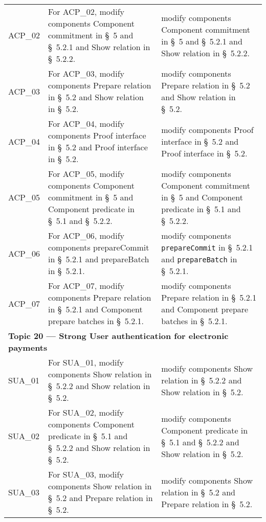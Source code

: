 \begin{landscape}
\begin{longtable}{p{3cm} p{10cm} p{7cm}}
ACP\_02 &
For ACP\_02, modify components Component commitment in \S~5 and \S~5.2.1 and Show relation in \S~5.2.2. &
modify components Component commitment in \S~5 and \S~5.2.1 and Show relation in \S~5.2.2. \\

ACP\_03 &
For ACP\_03, modify components Prepare relation in \S~5.2 and Show relation in \S~5.2. &
modify components Prepare relation in \S~5.2 and Show relation in \S~5.2. \\

ACP\_04 &
For ACP\_04, modify components Proof interface in \S~5.2 and Proof interface in \S~5.2. &
modify components Proof interface in \S~5.2 and Proof interface in \S~5.2. \\

ACP\_05 &
For ACP\_05, modify components Component commitment in \S~5 and Component predicate in \S~5.1 and \S~5.2.2. &
modify components Component commitment in \S~5 and Component predicate in \S~5.1 and \S~5.2.2. \\

ACP\_06 &
For ACP\_06, modify components prepareCommit in \S~5.2.1 and prepareBatch in \S~5.2.1. &
modify components \texttt{prepareCommit} in \S~5.2.1 and \texttt{prepareBatch} in \S~5.2.1. \\

ACP\_07 &
For ACP\_07, modify components Prepare relation in \S~5.2.1 and Component prepare batches in \S~5.2.1. &
modify components Prepare relation in \S~5.2.1 and Component prepare batches in \S~5.2.1. \\[1em]


\multicolumn{3}{l}{\textbf{Topic 20 — Strong User authentication for electronic payments}}\\

SUA\_01 &
For SUA\_01, modify components Show relation in \S~5.2.2 and Show relation in \S~5.2. &
modify components Show relation in \S~5.2.2 and Show relation in \S~5.2. \\

SUA\_02 &
For SUA\_02, modify components Component predicate in \S~5.1 and \S~5.2.2 and Show relation in \S~5.2. &
modify components Component predicate in \S~5.1 and \S~5.2.2 and Show relation in \S~5.2. \\

SUA\_03 &
For SUA\_03, modify components Show relation in \S~5.2 and Prepare relation in \S~5.2. &
modify components Show relation in \S~5.2 and Prepare relation in \S~5.2. \\


\end{longtable}
\end{landscape}
